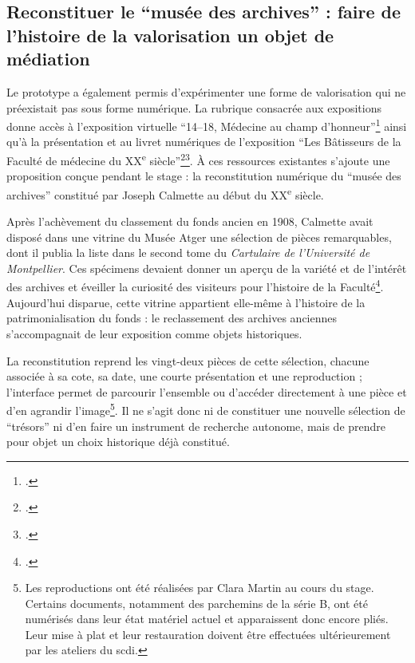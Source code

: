 \subsection{Reconstituer le \enquote{musée des archives} : faire de l'histoire de la valorisation un objet de médiation}

Le prototype a également permis d'expérimenter une forme de valorisation qui ne préexistait pas sous forme numérique. La rubrique consacrée aux expositions donne accès à l'exposition virtuelle \enquote{14--18, Médecine au champ d'honneur}\footcite{UMExpositionMedecine1418} ainsi qu'à la présentation et au livret numériques de l'exposition \enquote{Les Bâtisseurs de la Faculté de médecine du XX\textsuperscript{e} siècle}\footcite{BatisseursFaculte2021}\footcite{BatisseursFaculte2021Livret}. À ces ressources existantes s'ajoute une proposition conçue pendant le stage : la reconstitution numérique du \enquote{musée des archives} constitué par Joseph Calmette au début du XX\textsuperscript{e} siècle.

Après l'achèvement du classement du fonds ancien en 1908, Calmette avait disposé dans une vitrine du Musée Atger une sélection de pièces remarquables, dont il publia la liste dans le second tome du \emph{Cartulaire de l'Université de Montpellier}. Ces spécimens devaient donner un aperçu de la variété et de l'intérêt des archives et éveiller la curiosité des visiteurs pour l'histoire de la Faculté\footcite[p.~XVI--XXI, vues~35 à 40 de la version numérisée]{CalmetteCartulaire1912}. Aujourd'hui disparue, cette vitrine appartient elle-même à l'histoire de la patrimonialisation du fonds : le reclassement des archives anciennes s'accompagnait de leur exposition comme objets historiques.

La reconstitution reprend les vingt-deux pièces de cette sélection, chacune associée à sa cote, sa date, une courte présentation et une reproduction ; l'interface permet de parcourir l'ensemble ou d'accéder directement à une pièce et d'en agrandir l'image\footnote{Les reproductions ont été réalisées par Clara Martin au cours du stage. Certains documents, notamment des parchemins de la série B, ont été numérisés dans leur état matériel actuel et apparaissent donc encore pliés. Leur mise à plat et leur restauration doivent être effectuées ultérieurement par les ateliers du \gls{scdi}.}. Il ne s'agit donc ni de constituer une nouvelle sélection de \enquote{trésors} ni d'en faire un instrument de recherche autonome, mais de prendre pour objet un choix historique déjà constitué.


